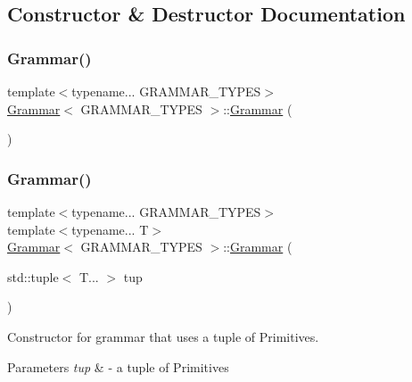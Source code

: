 \subsection{Constructor \& Destructor Documentation}
\mbox{\label{class_grammar_a2fa1d41e021616790a5ec8f4b3de9b08}} 
\subsubsection{\texorpdfstring{Grammar()}{Grammar()}\hspace{0.1cm}{\footnotesize\ttfamily [1/4]}}
{\footnotesize\ttfamily template$<$typename... G\+R\+A\+M\+M\+A\+R\+\_\+\+T\+Y\+P\+ES$>$ \\
\hyperlink{class_grammar}{Grammar}$<$ G\+R\+A\+M\+M\+A\+R\+\_\+\+T\+Y\+P\+ES $>$\+::\hyperlink{class_grammar}{Grammar} (\begin{DoxyParamCaption}{ }\end{DoxyParamCaption})\hspace{0.3cm}{\ttfamily [inline]}}

\mbox{\label{class_grammar_a7db6840d96e910a788968ebb2fe62df4}} 
\subsubsection{\texorpdfstring{Grammar()}{Grammar()}\hspace{0.1cm}{\footnotesize\ttfamily [2/4]}}
{\footnotesize\ttfamily template$<$typename... G\+R\+A\+M\+M\+A\+R\+\_\+\+T\+Y\+P\+ES$>$ \\
template$<$typename... T$>$ \\
\hyperlink{class_grammar}{Grammar}$<$ G\+R\+A\+M\+M\+A\+R\+\_\+\+T\+Y\+P\+ES $>$\+::\hyperlink{class_grammar}{Grammar} (\begin{DoxyParamCaption}\item[{std\+::tuple$<$ T... $>$}]{tup }\end{DoxyParamCaption})\hspace{0.3cm}{\ttfamily [inline]}}

Constructor for grammar that uses a tuple of Primitives. 
\begin{DoxyParams}{Parameters}
{\em tup} & -\/ a tuple of Primitives\\
\hline
\end{DoxyParams}
\mbox{\label{class_grammar_a70df918794a43cbd26bae1096c92dead}} 
